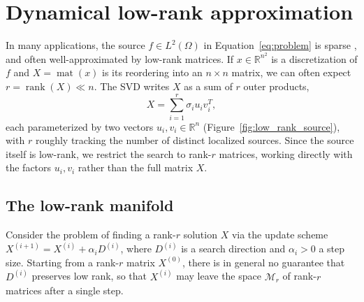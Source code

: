 \section{Dynamical low-rank approximation}\label{sec:dynamical_low_rank_approximation}

In many applications, the source $f \in L^2(\Omega)$ in Equation~\eqref{eq:problem} is sparse \cite{elvetunWeightedSparsityRegularization2023}, and often well-approximated by low-rank matrices. If $x \in \mathbb{R}^{n^2}$ is a discretization of $f$ and $X = \operatorname{mat}(x)$ is its reordering into an $n \times n$ matrix, we can often expect $r = \operatorname{rank}(X) \ll n$. The SVD writes $X$ as a sum of $r$ outer products,
\begin{equation*}
    X = \sum_{i=1}^{r} \sigma_i u_i v_i^T,
\end{equation*}
each parameterized by two vectors $u_i, v_i \in \mathbb{R}^n$ (Figure~\ref{fig:low_rank_source}), with $r$ roughly tracking the number of distinct localized sources. Since the source itself is low-rank, we restrict the search to rank-$r$ matrices, working directly with the factors $u_i, v_i$ rather than the full 
matrix $X$.
%


\subsection{The low-rank manifold}

Consider the problem of finding a rank-$r$ solution $X$ via the update scheme $X^{(i+1)} = X^{(i)} + \alpha_i D^{(i)}$, where $D^{(i)}$ is a search direction and $\alpha_i > 0$ a step size. Starting from a rank-$r$ matrix $X^{(0)}$, there is in general no guarantee that $D^{(i)}$ preserves low rank, so that $X^{(i)}$ may leave the space $\mathcal{M}_r$ of rank-$r$ matrices after a single step.
%

